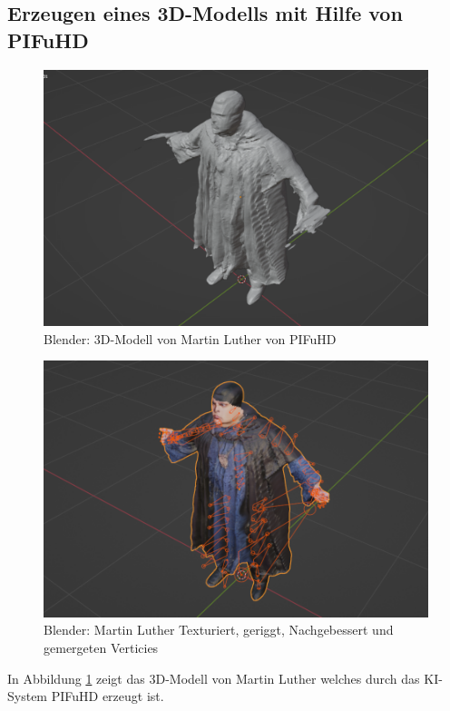 \subsection{Erzeugen eines 3D-Modells mit Hilfe von PIFuHD}
\begin{figure}
	\centering
	\includegraphics[width=14cm]{BilderFuerBA/BlenderMLVonPIFuHD105k.png}
	\caption{Blender: 3D-Modell von Martin Luther von PIFuHD}
	\label{BlenderMLVonPIFuHD105k}
\end{figure}
\begin{figure}
	\centering
	\includegraphics[width=14cm]{BilderFuerBA/BlenderMLGeriggtUndTexturiert95k.png}
	\caption{Blender: Martin Luther Texturiert, geriggt, Nachgebessert und gemergeten Verticies}
	\label{BlenderMLGeriggtUndTexturiert95k}
\end{figure}
In Abbildung \ref{BlenderMLVonPIFuHD105k} zeigt das 3D-Modell von Martin Luther welches durch das KI-System PIFuHD erzeugt ist.
